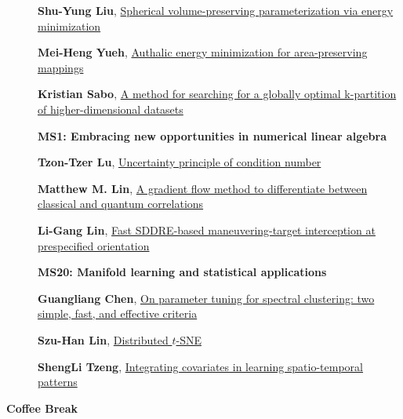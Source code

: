 \documentclass[ILAS2025-program.tex]{subfiles}
\begin{document}
\begin{description}
\begin{description}
    \item[] \hypertarget{up0067}{}\textbf{Shu-Yung Liu}, \hyperlink{down0067}{Spherical volume-preserving parameterization via energy minimization}
        \item[] \hypertarget{up0068}{}\textbf{Mei-Heng Yueh}, \hyperlink{down0068}{Authalic energy minimization for area-preserving mappings}
        \item[] \hypertarget{up0069}{}\textbf{Kristian Sabo}, \hyperlink{down0069}{A method for searching for a globally optimal k-partition of higher-dimensional datasets}
        \end{description}
    \begin{description}
    \item[] {\color{mstitle}\textbf{MS1: Embracing new opportunities in numerical linear algebra}} 
    \item[] \hypertarget{up0070}{}\textbf{Tzon-Tzer Lu}, \hyperlink{down0070}{Uncertainty principle of condition number}
        \item[] \hypertarget{up0071}{}\textbf{Matthew M. Lin}, \hyperlink{down0071}{A gradient flow method to differentiate between classical and quantum correlations
}
        \item[] \hypertarget{up0072}{}\textbf{Li-Gang Lin}, \hyperlink{down0072}{Fast SDDRE-based maneuvering-target interception at prespecified orientation}
        \end{description}
    \begin{description}
    \item[] {\color{mstitle}\textbf{MS20: Manifold learning and statistical applications}} 
    \item[] \hypertarget{up0073}{}\textbf{Guangliang Chen}, \hyperlink{down0073}{On parameter tuning for spectral clustering: two simple, fast, and effective criteria}
        \item[] \hypertarget{up0074}{}\textbf{Szu-Han Lin}, \hyperlink{down0074}{Distributed $t$-SNE}
        \item[] \hypertarget{up0075}{}\textbf{ShengLi Tzeng}, \hyperlink{down0075}{Integrating covariates in learning spatio-temporal patterns}
        \end{description}
    \item[\info{15:30\textrm{--}16:00}] \textbf{Coffee Break} 

\end{description}
\end{document}
